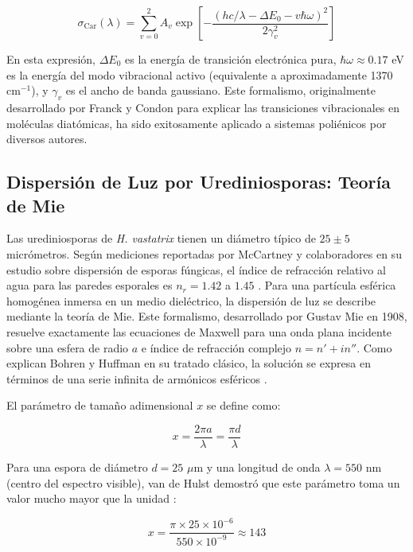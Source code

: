 \documentclass[12pt, a4paper]{article}
\begin{document}
	\begin{equation}
		\sigma_{\text{Car}}(\lambda) = \sum_{v=0}^{2} A_v \exp\!\left[ -\frac{(hc/\lambda - \Delta E_0 - v\hbar\omega)^2}{2\gamma_v^2} \right]
		\label{eq:espectro_carotenoide_vibracional}
	\end{equation}
	
	En esta expresión, $\Delta E_0$ es la energía de transición electrónica pura, $\hbar\omega \approx 0.17$ eV es la energía del modo vibracional activo (equivalente a aproximadamente 1370 cm$^{-1}$), y $\gamma_v$ es el ancho de banda gaussiano. Este formalismo, originalmente desarrollado por Franck y Condon para explicar las transiciones vibracionales en moléculas diatómicas, ha sido exitosamente aplicado a sistemas poliénicos por diversos autores.
	
	\subsection{Dispersión de Luz por Urediniosporas: Teoría de Mie}
	
	Las urediniosporas de \textit{H. vastatrix} tienen un diámetro típico de $25 \pm 5$ micrómetros. Según mediciones reportadas por McCartney y colaboradores en su estudio sobre dispersión de esporas fúngicas, el índice de refracción relativo al agua para las paredes esporales es $n_r = 1.42$ a $1.45$ \parencite{mccartney2006}. Para una partícula esférica homogénea inmersa en un medio dieléctrico, la dispersión de luz se describe mediante la teoría de Mie. Este formalismo, desarrollado por Gustav Mie en 1908, resuelve exactamente las ecuaciones de Maxwell para una onda plana incidente sobre una esfera de radio $a$ e índice de refracción complejo $n = n' + i n''$. Como explican Bohren y Huffman en su tratado clásico, la solución se expresa en términos de una serie infinita de armónicos esféricos \parencite{bohren1983}.
	
	El parámetro de tamaño adimensional $x$ se define como:
	
	\begin{equation}
		x = \frac{2\pi a}{\lambda} = \frac{\pi d}{\lambda}
		\label{eq:parametro_tamano}
	\end{equation}
	
	Para una espora de diámetro $d = 25$ $\mu$m y una longitud de onda $\lambda = 550$ nm (centro del espectro visible), van de Hulst demostró que este parámetro toma un valor mucho mayor que la unidad \parencite{vandeHulst1981}:
	
	\begin{equation}
		x = \frac{\pi \times 25 \times 10^{-6}}{550 \times 10^{-9}} \approx 143
		\label{eq:x_calculado}
	\end{equation}
	
\end{document}
